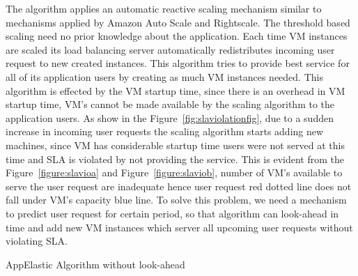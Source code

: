 The algorithm applies an automatic reactive scaling mechanism similar to mechanisms applied by Amazon Auto Scale and Rightscale\cite{han2012lightweight}. The threshold based scaling need no prior knowledge about the application. Each time VM instances are scaled its load balancing server automatically redistributes incoming user request to new created instances\cite{han2012lightweight}. This algorithm tries to provide best service for all of its application users by creating as much VM instances needed. This algorithm is effected by the VM startup time, since there is an overhead in VM startup time, VM's cannot be made available by the scaling algorithm to the application users. As show in the Figure~\ref{fig:slaviolationfig}, due to a sudden increase in incoming user requests the scaling algorithm starts adding new machines, since VM has considerable startup time users were not served at this time and SLA is violated by not providing the service. This is evident from the Figure~\ref{figure:slavioa} and Figure~\ref{figure:slaviob}, number of VM's available to serve the user request are inadequate hence user request red dotted line does not fall under VM's capacity blue line. To solve this problem, we need a mechanism to predict user request for certain period, so that algorithm can look-ahead in time and add new VM instances which server all upcoming user requests without violating SLA.

\LinesNumbered
\begin{algorithm}[H]
 \caption{AppElastic Algorithm without look-ahead}
 \label{algo:appelasticwithoutlookahead}
\end{algorithm}

